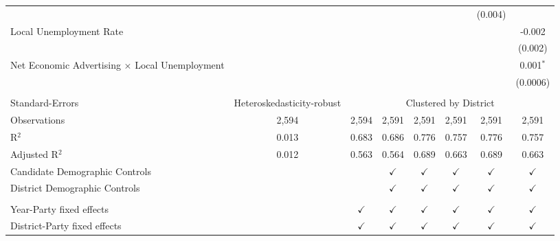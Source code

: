 \begin{table}[htbp]
\begin{tabular}{lccccccc}
                                                    &               &               &               &               &               & (0.004)       &   \\   
      Local Unemployment Rate                       &               &               &               &               &               &               & -0.002\\   
                                                    &               &               &               &               &               &               & (0.002)\\   
      Net Economic Advertising × Local Unemployment &               &               &               &               &               &               & 0.001$^{*}$\\   
                                                    &               &               &               &               &               &               & (0.0006)\\   
       \\
      Standard-Errors & Heteroskedasticity-robust & \multicolumn{6}{c}{Clustered by District} \\ 
      Observations                                  & 2,594         & 2,594         & 2,591         & 2,591         & 2,591         & 2,591         & 2,591\\  
      R$^2$                                         & 0.013         & 0.683         & 0.686         & 0.776         & 0.757         & 0.776         & 0.757\\  
      Adjusted R$^2$                                & 0.012         & 0.563         & 0.564         & 0.689         & 0.663         & 0.689         & 0.663\\  
      Candidate Demographic Controls                &               &               & $\checkmark$  & $\checkmark$  & $\checkmark$  & $\checkmark$  & $\checkmark$\\   
      District Demographic Controls                 &               &               & $\checkmark$  & $\checkmark$  & $\checkmark$  & $\checkmark$  & $\checkmark$\\   
       \\
      Year-Party fixed effects                      &               & $\checkmark$  & $\checkmark$  & $\checkmark$  & $\checkmark$  & $\checkmark$  & $\checkmark$\\   
      District-Party fixed effects                  &               & $\checkmark$  & $\checkmark$  & $\checkmark$  & $\checkmark$  & $\checkmark$  & $\checkmark$\\   
      \bottomrule
   \end{tabular}
   

\end{table}

